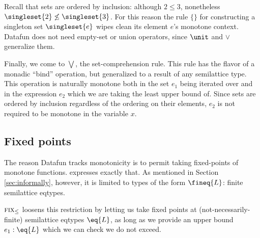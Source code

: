 Recall that sets are ordered by inclusion: although $2 \le 3$, nonetheless
$\singleset{2} \not\le \singleset{3}$. For this reason the rule $\{\}$ for
constructing a singleton set $\singleset{e}$ wipes clean its element $e$'s
monotone context. Datafun does not need empty-set or union operators, since
$\unit$ and $\vee$ generalize them.

Finally, we come to $\bigvee$, the set-comprehension rule. This rule has the
flavor of a monadic ``bind'' operation, but generalized to a result of any
semilattice type. This operation is naturally monotone both in the set $e_1$
being iterated over and in the expression $e_2$ which we are taking the least
upper bound of. Since sets are ordered by inclusion regardless of the ordering
on their elements, $e_2$ is not required to be monotone in the variable $x$.


\subsection{Fixed points}

The reason Datafun tracks monotonicity is to permit taking fixed-points of
monotone functions.  expresses exactly that. As mentioned in Section
\ref{sec:informally}, however, it is limited to types of the form $\fineq{L}$:
finite semilattice eqtypes.

$\textsc{fix}_\le$ loosens this restriction by letting us take fixed points at
(not-necessarily-finite) semilattice eqtypes $\eq{L}$, as long as we provide an
upper bound $e_1 : \eq{L}$ which we can check we do not exceed.
